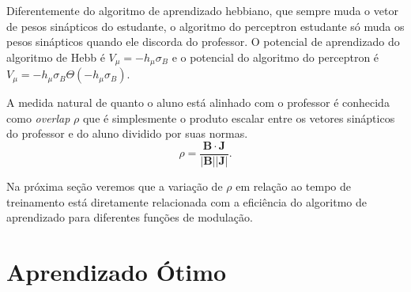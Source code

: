 Diferentemente do algoritmo de aprendizado hebbiano, que sempre muda o vetor
de pesos sinápticos do estudante, o algoritmo do perceptron estudante só
muda os pesos sinápticos quando ele discorda do professor. O potencial de
aprendizado do algoritmo de Hebb é $ V_\mu = -h_\mu\sigma_B$ e o potencial do
algoritmo do perceptron é $V_\mu = -h_\mu\sigma_B\Theta\left(-h_\mu\sigma_B\right)$.

A medida natural de quanto o aluno está alinhado com o professor é conhecida
como \textit{overlap} $\rho$ que é simplesmente o produto escalar entre os
vetores sinápticos do professor e do aluno dividido por suas normas. 
\begin{equation}
  \rho =
  \frac{\mathbf{B}\cdot\mathbf{J}}{\left|\mathbf{B}\right|\left|\mathbf{J}\right|}.
  \label{eq:def_rho}
\end{equation}

Na próxima seção veremos que a variação de $\rho$ em relação ao tempo
de treinamento está diretamente relacionada com a eficiência do algoritmo
de aprendizado para diferentes funções de modulação.

\section{Aprendizado Ótimo}
\label{sec:AprendizadoOtimo}


